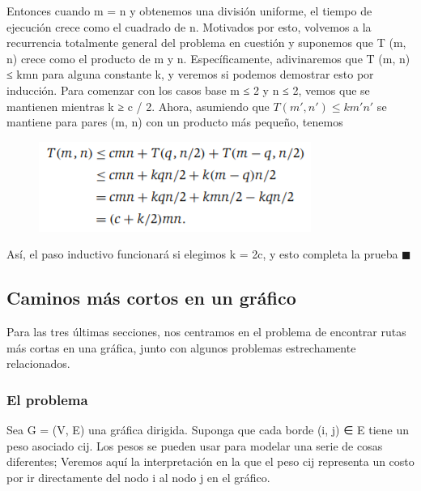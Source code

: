 \documentclass[a4paper]{article}
\begin{document}
Entonces cuando m = n y obtenemos una división uniforme, el tiempo de ejecución crece como el cuadrado de n. Motivados por esto, volvemos a la recurrencia totalmente general del problema en cuestión y suponemos que T (m, n) crece como el producto de m y n. Específicamente, adivinaremos que T (m, n) ≤ kmn para alguna constante k, y veremos si podemos demostrar esto por inducción. Para comenzar con los casos base m ≤ 2 y n ≤ 2, vemos que se mantienen mientras k ≥ c / 2. Ahora, asumiendo que $ T (m ', n') ≤ km'n '$ se mantiene para pares (m, n) con un producto más pequeño, tenemos\\


\begin{figure}[h]
\centering
\includegraphics[scale=1]{Imagenes-Seccion6/form6_3.PNG}
\end{figure}

Así, el paso inductivo funcionará si elegimos k = 2c, y esto completa la prueba $\blacksquare$\\

\subsection{Caminos más cortos en un gráfico}

Para las tres últimas secciones, nos centramos en el problema de encontrar rutas más cortas en una gráfica, junto con algunos problemas estrechamente relacionados.\\

\subsubsection*{El problema}

Sea G = (V, E) una gráfica dirigida. Suponga que cada borde (i, j) ∈ E tiene un peso asociado cij. Los pesos se pueden usar para modelar una serie de cosas diferentes; Veremos aquí la interpretación en la que el peso cij representa un costo por ir directamente del nodo i al nodo j en el gráfico.\\
\end{document}
